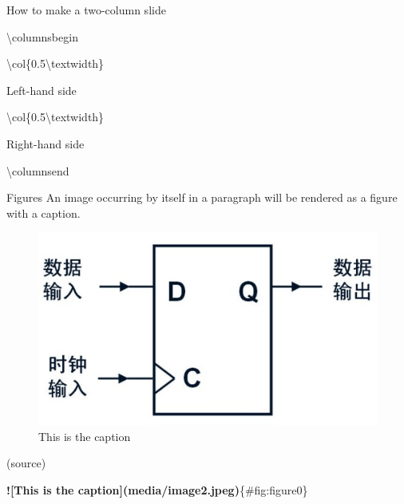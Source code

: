 \documentclass[
  10pt,
  ignorenonframetext,
  serif,onlymath]{beamer}
\newenvironment{Shaded}{}{}
\newcommand{\AlertTok}[1]{\textcolor[rgb]{1.00,0.00,0.00}{\textbf{#1}}}
\newcommand{\NormalTok}[1]{#1}
\begin{document}
\begin{frame}[fragile]{How to make a two-column slide}
\protect\hypertarget{sec:how-to-make-a-two-column-slide}{}
\begin{Shaded}
\begin{Highlighting}[]
\NormalTok{\textbackslash{}columnsbegin}

\NormalTok{\textbackslash{}col\{0.5\textbackslash{}textwidth\}}

\NormalTok{  Left{-}hand side}

\NormalTok{\textbackslash{}col\{0.5\textbackslash{}textwidth\}}

\NormalTok{  Right{-}hand side}

\NormalTok{\textbackslash{}columnsend}
\end{Highlighting}
\end{Shaded}
\end{frame}

\begin{frame}[fragile]{Figures}
\protect\hypertarget{sec:figures}{}
An image occurring by itself in a paragraph will be rendered as a figure
with a caption.

\begin{figure}
\hypertarget{fig:figure0}{%
\centering
\includegraphics{media/image2.jpeg}
\caption{This is the caption}\label{fig:figure0}
}
\end{figure}

(source)

\begin{Shaded}
\begin{Highlighting}[]
\AlertTok{![This is the caption](media/image2.jpeg)}\NormalTok{\{\#fig:figure0\}}
\end{Highlighting}
\end{Shaded}
\end{frame}
\end{document}
